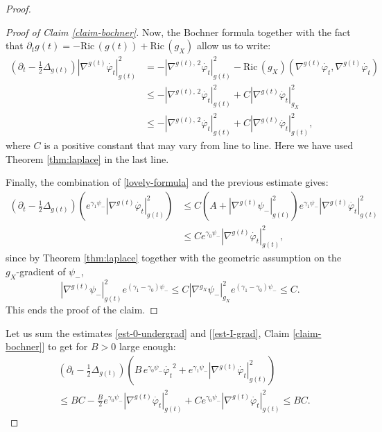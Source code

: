 \documentclass[a4paper,11pt,leqno,english]{smfart}
\theoremstyle{plain}
\theoremstyle{plain}
\numberwithin{equation}{section} %
\numberwithin{figure}{section} %
\theoremstyle{plain}
\theoremstyle{plain}
\theoremstyle{remark}
\theoremstyle{remark}
\theoremstyle{definition}
\theoremstyle{plain}
\theoremstyle{plain}
\theoremstyle{definition}
\newcommand{\f}{\varphi}
\newcommand{\Ric}{\mathrm{Ric} \,}
\begin{document}
\begin{proof}
\begin{proof}[Proof of Claim \ref{claim-bochner}]
Now, the Bochner formula together with the fact that $\partial_tg(t)=-\Ric(g(t))+\Ric(g_X)$ allow us to write:
\begin{equation*}
\begin{split}
\left(\partial_t-\frac{1}{2}\Delta_{g(t)}\right)|\nabla^{g(t)}\dot{\f_t}|^2_{g(t)}&=-|\nabla^{g(t),\,2}\dot{\f_t}|^2_{g(t)}-\Ric(g_X)(\nabla^{g(t)}\dot{\f_t},\nabla^{g(t)}\dot{\f_t})\\
&\leq -|\nabla^{g(t),\,2}\dot{\f_t}|^2_{g(t)}+C|\nabla^{g(t)}\dot{\f_t}|^2_{g_X}\\
&\leq -|\nabla^{g(t),\,2}\dot{\f_t}|^2_{g(t)}+C|\nabla^{g(t)}\dot{\f_t}|^2_{g(t)},
\end{split}
\end{equation*}
where $C$ is a positive constant that may vary from line to line. Here we have used Theorem \ref{thm:laplace} in the last line.

Finally, the combination of \eqref{lovely-formula} and the previous estimate gives: 
\begin{equation*}
\begin{split}
\left(\partial_t-\frac{1}{2}\Delta_{g(t)}\right)\left(e^{\gamma_1\psi_{-}}|\nabla^{g(t)}\dot{\f_t}|_{g(t)}^2\right)&\leq C\left(A+|\nabla^{g(t)}\psi_{-}|^2_{g(t)}\right)e^{\gamma_1\psi_{-}}|\nabla^{g(t)}\dot{\f_t}|_{g(t)}^2\\
&\leq Ce^{\gamma_0\psi_{-}}|\nabla^{g(t)}\dot{\f_t}|_{g(t)}^2,
\end{split}
\end{equation*}
since by Theorem \ref{thm:laplace} together with the geometric assumption on the $g_X$-gradient of $\psi_{-}$, 
$$
|\nabla^{g(t)}\psi_{-}|^2_{g(t)}e^{(\gamma_1-\gamma_0)\psi_{-}}
\leq C|\nabla^{g_X}\psi_{-}|_{g_X}^2e^{(\gamma_1-\gamma_0)\psi_{-}}\leq C.
$$
This ends the proof of the claim.
\end{proof}

Let us sum the estimates  \eqref{est-0-undergrad} and [\eqref{est-I-grad}, Claim \ref{claim-bochner}] to get for $B>0$ large enough:
\begin{equation*}
\begin{split}\label{est-I-grad-bis}
&\left(\partial_t-\frac{1}{2}\Delta_{g(t)}\right)\left(B\,e^{\gamma_0\psi_{-}}\dot{\f_t}^2+e^{\gamma_1\psi_{-}}|\nabla^{g(t)}\dot{\f_t}|_{g(t)}^2\right)\\
&\leq BC -\frac{B}{2}e^{\gamma_0\psi_{-}}|\nabla^{g(t)}\dot{\f_t}|^2_{g(t)} +Ce^{\gamma_0\psi_{-}}|\nabla^{g(t)}\dot{\f_t}|_{g(t)}^2
\leq BC.
\end{split}
\end{equation*}


\end{proof}
\end{document}
